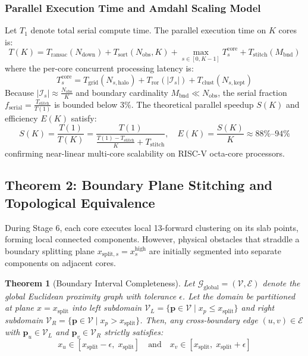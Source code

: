 \documentclass[journal,compsoc]{IEEEtran}
\newtheorem{theorem}{Theorem}
\begin{document}
\subsubsection{Parallel Execution Time and Amdahl Scaling Model}
Let $T_1$ denote total serial compute time. The parallel execution time on $K$ cores is:
\begin{equation}
T(K) = T_{\text{ransac}}(N_{\text{down}}) + T_{\text{sort}}(N_{\text{obs}}, K) + \max_{s \in [0, K-1]} T_s^{\text{core}} + T_{\text{stitch}}(M_{\text{bnd}})
\label{eq:parallel_time}
\end{equation}
where the per-core concurrent processing latency is:
\begin{equation}
T_s^{\text{core}} = T_{\text{grid}}(N_{s, \text{halo}}) + T_{\text{ror}}(|\mathcal{I}_s|) + T_{\text{clust}}(N_{s, \text{kept}})
\end{equation}
Because $|\mathcal{I}_s| \approx \frac{N_{\text{obs}}}{K}$ and boundary cardinality $M_{\text{bnd}} \ll N_{\text{obs}}$, the serial fraction $f_{\text{serial}} = \frac{T_{\text{stitch}}}{T(1)}$ is bounded below $3\%$. The theoretical parallel speedup $S(K)$ and efficiency $E(K)$ satisfy:
\begin{equation}
S(K) = \frac{T(1)}{T(K)} = \frac{T(1)}{\frac{T(1) - T_{\text{stitch}}}{K} + T_{\text{stitch}}}, \quad E(K) = \frac{S(K)}{K} \approx 88\%\text{--}94\%
\end{equation}
confirming near-linear multi-core scalability on RISC-V octa-core processors.

\subsection{Theorem 2: Boundary Plane Stitching and Topological Equivalence}
\label{sec:boundary_stitching}

During Stage 6, each core executes local 13-forward clustering on its slab points, forming local connected components. However, physical obstacles that straddle a boundary splitting plane $x_{\text{split}, s} = x_s^{\text{high}}$ are initially segmented into separate components on adjacent cores.

\begin{theorem}[Boundary Interval Completeness]
Let $\mathcal{G}_{\text{global}} = (\mathcal{V}, \mathcal{E})$ denote the global Euclidean proximity graph with tolerance $\epsilon$. Let the domain be partitioned at plane $x = x_{\text{split}}$ into left subdomain $\mathcal{V}_L = \{ \bm{p} \in \mathcal{V} \mid x_p \le x_{\text{split}} \}$ and right subdomain $\mathcal{V}_R = \{ \bm{p} \in \mathcal{V} \mid x_p > x_{\text{split}} \}$.
Then, any cross-boundary edge $(u, v) \in \mathcal{E}$ with $\bm{p}_u \in \mathcal{V}_L$ and $\bm{p}_v \in \mathcal{V}_R$ strictly satisfies:
\begin{equation}
x_u \in [x_{\text{split}} - \epsilon, \; x_{\text{split}}] \quad \text{and} \quad x_v \in [x_{\text{split}}, \; x_{\text{split}} + \epsilon]
\label{eq:bnd_interval}
\end{equation}
\end{theorem}
\end{document}

